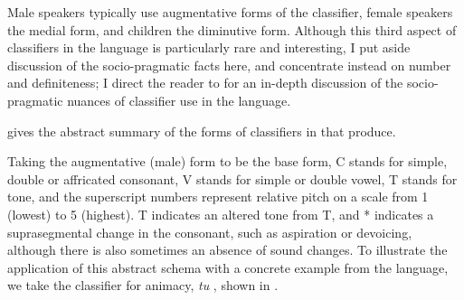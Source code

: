 \documentclass[output=paper
,modfonts
,nonflat]{langsci/langscibook}
\begin{document}
Male speakers typically use augmentative forms of the classifier, female speakers the medial form, and children the diminutive form. Although this third aspect of classifiers in the language is particularly rare and interesting, I put aside discussion of the socio-pragmatic facts here, and concentrate instead on number and definiteness; I direct the reader to \citet{GernerBisang2008,GernerBisang2010} for an in-depth discussion of the socio-pragmatic nuances of classifier use in the language.

 gives the abstract summary of the forms of classifiers in  that \citet[721]{GernerBisang2008} produce.

\begin{table}[h]
\caption{Summary of the forms of classifiers in \label{tab:hall:2}}
\end{table}

Taking the augmentative (male) form to be the base form, C stands for simple, double or affricated consonant, V stands for simple or double vowel, T stands for tone, and the superscript numbers represent relative pitch on a scale from 1 (lowest) to 5 (highest). T\tss{$\prime$} indicates an altered tone from T, and * indicates a suprasegmental change in the consonant, such as aspiration or devoicing, although there is also sometimes an absence of sound changes. To illustrate the application of this abstract schema with a concrete example from the language, we take the classifier for animacy, \textit{tu} \citep[722]{GernerBisang2008}, shown in .
\end{document}
